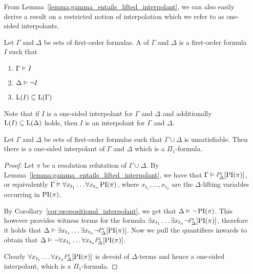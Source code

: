 From Lemma~\ref{lemma:gamma_entails_lifted_interpolant}, we can also easily derive a result on a restricted notion of interpolation which we refer to as one-sided interpolants. 

\begin{defi}
	Let $\Gamma$ and $\Delta$ be sets of first-order formulas.
	A  of $\Gamma$ and $\Delta$ is a first-order formula $I$ such that
	\begin{enumerate}
		\item $\Gamma \vDash I$
		\item $\Delta \vDash \lnot I$
		\item $\operatorname{L}(I) \subseteq \operatorname{L}(\Gamma) $
			\qedhere
	\end{enumerate}
\end{defi}

Note that if $I$ is a one-sided interpolant for $\Gamma$ and $\Delta$ and additionally $\operatorname{L}(I) \subseteq \operatorname{L}(\Delta)$ holds, then $I$ is an interpolant for $\Gamma$ and $\Delta$.

\begin{prop}
	Let $\Gamma$ and $\Delta$ be sets of first-order formulas such that $\Gamma\cup\Delta$ is unsatisfiable.
	Then there is a one-sided interpolant of $\Gamma$ and $\Delta$ which is a $\Pi_1$-formula.
\end{prop}
\begin{proof}
	Let $\pi$ be a resolution refutation of $\Gamma\cup\Delta$.
	By Lemma~\ref{lemma:gamma_entails_lifted_interpolant}, we have that
	$ \Gamma \vDash \ell_{\Delta}^{x}[\operatorname{PI}(\pi)]$,
	or equivalently
	$\Gamma \vDash \forall x_{t_1} \dots \forall x_{t_n}  \operatorname{PI}(\pi)$, where $x_{t_1}, \dots, x_{t_n}$ are the $\Delta$-lifting variables occurring in $\operatorname{PI}(\pi)$.

	By Corollary~\ref{cor:propositional_interpolant}, we get that
	$\Delta \vDash \lnot \operatorname{PI}(\pi)$.
	This however provides witness terms for the formula
	$\exists x_{t_1} \dots \exists x_{t_n} \lnot \ell_{\Delta}^{x}[ \operatorname{PI}(\pi) ]$, therefore it holds that
	$\Delta \vDash \exists x_{t_1} \dots \exists x_{t_n} \lnot \ell_{\Delta}^{x}[ \operatorname{PI}(\pi) ]$. Now we pull the quantifiers inwards to obtain that
	$\Delta \vDash \lnot  \forall x_{t_1} \dots \forall x_{t_n} \ell_{\Delta}^{x}[ \operatorname{PI}(\pi) ]$.

	Clearly $\forall x_{t_1} \dots \forall x_{t_n} \ell_{\Delta}^{x}[ \operatorname{PI}(\pi) ]$ is devoid of $\Delta$-terms and hence a one-sided interpolant, which is a $\Pi_1$-formula.
\end{proof}


